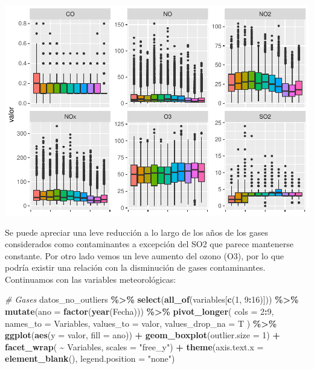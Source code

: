 \documentclass[notspecified,article,submit,moreauthors,pdftex]{Definitions/mdpi}
\newenvironment{Shaded}{\begin{snugshade}}{\end{snugshade}}
\newcommand{\AttributeTok}[1]{\textcolor[rgb]{0.13,0.29,0.53}{#1}}
\newcommand{\CommentTok}[1]{\textcolor[rgb]{0.56,0.35,0.01}{\textit{#1}}}
\newcommand{\DecValTok}[1]{\textcolor[rgb]{0.00,0.00,0.81}{#1}}
\newcommand{\FunctionTok}[1]{\textcolor[rgb]{0.13,0.29,0.53}{\textbf{#1}}}
\newcommand{\NormalTok}[1]{#1}
\newcommand{\SpecialCharTok}[1]{\textcolor[rgb]{0.81,0.36,0.00}{\textbf{#1}}}
\newcommand{\StringTok}[1]{\textcolor[rgb]{0.31,0.60,0.02}{#1}}
\begin{document}
\includegraphics{Memoria_files/figure-latex/unnamed-chunk-21-1.pdf}

Se puede apreciar una leve reducción a lo largo de los años de los gases
considerados como contaminantes a excepción del SO2 que parece
mantenerse constante. Por otro lado vemos un leve aumento del ozono
(O3), por lo que podría existir una relación con la disminución de gases
contaminantes. Continuamos con las variables meteorológicas:

\begin{Shaded}
\begin{Highlighting}[]
\CommentTok{\# Gases}
\NormalTok{datos\_no\_outliers }\SpecialCharTok{\%\textgreater{}\%}
  \FunctionTok{select}\NormalTok{(}\FunctionTok{all\_of}\NormalTok{(variables[}\FunctionTok{c}\NormalTok{(}\DecValTok{1}\NormalTok{, }\DecValTok{9}\SpecialCharTok{:}\DecValTok{16}\NormalTok{)])) }\SpecialCharTok{\%\textgreater{}\%}
  \FunctionTok{mutate}\NormalTok{(}\AttributeTok{ano =} \FunctionTok{factor}\NormalTok{(}\FunctionTok{year}\NormalTok{(Fecha))) }\SpecialCharTok{\%\textgreater{}\%}
  \FunctionTok{pivot\_longer}\NormalTok{(}
    \AttributeTok{cols =} \DecValTok{2}\SpecialCharTok{:}\DecValTok{9}\NormalTok{,}
    \AttributeTok{names\_to =} \StringTok{\textquotesingle{}Variables\textquotesingle{}}\NormalTok{,}
    \AttributeTok{values\_to =} \StringTok{\textquotesingle{}valor\textquotesingle{}}\NormalTok{,}
    \AttributeTok{values\_drop\_na =}\NormalTok{ T}
\NormalTok{  ) }\SpecialCharTok{\%\textgreater{}\%}
  \FunctionTok{ggplot}\NormalTok{(}\FunctionTok{aes}\NormalTok{(}\AttributeTok{y =}\NormalTok{ valor, }\AttributeTok{fill =}\NormalTok{ ano)) }\SpecialCharTok{+}
  \FunctionTok{geom\_boxplot}\NormalTok{(}\AttributeTok{outlier.size =} \DecValTok{1}\NormalTok{) }\SpecialCharTok{+}
  \FunctionTok{facet\_wrap}\NormalTok{( }\SpecialCharTok{\textasciitilde{}}\NormalTok{ Variables, }\AttributeTok{scales =} \StringTok{"free\_y"}\NormalTok{) }\SpecialCharTok{+}
  \FunctionTok{theme}\NormalTok{(}\AttributeTok{axis.text.x =} \FunctionTok{element\_blank}\NormalTok{(), }\AttributeTok{legend.position =} \StringTok{"none"}\NormalTok{)}
\end{Highlighting}
\end{Shaded}
\end{document}
